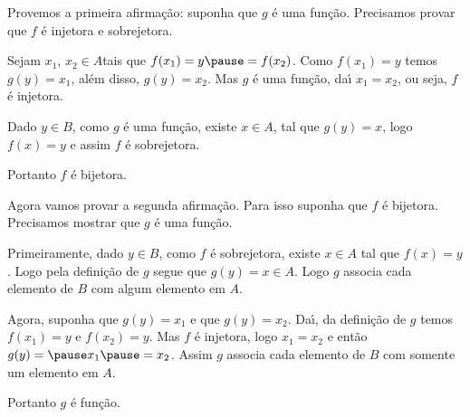 \documentclass{beamer}
\begin{document}
    \begin{frame}
        Provemos a primeira afirma\c{c}\~ao: \pause suponha que $g$ \'e uma fun\c{c}\~ao. \pause Precisamos provar que $f$ {\'e} injetora \pause e sobrejetora.\pause

        \vspace{.5cm}

        Sejam $x_1$, \pause $x_2 \in A$\pause  tais que $f(x_1) = y \pause = f(x_2)$. \pause Como $f(x_1) = y$ \pause temos $g(y) = x_1$, \pause al{\'e}m disso, \pause $g(y) = x_2$. \pause Mas $g$ {\'e} uma fun{\c c}{\~a}o, \pause da{\'\i} $x_1 = x_2$, \pause ou seja, \pause $f$ {\'e} injetora.\pause
        
        \vspace{.5cm}

        Dado $y \in B$, \pause como $g$ {\'e} uma fun{\c c}{\~a}o, \pause existe $x \in A$, \pause tal que $g(y) = x$, \pause logo $f(x) = y$ \pause e assim $f$ {\'e} sobrejetora.\pause

        \vspace{.5cm}

        Portanto $f$ {\'e} bijetora.\pause
    \end{frame}

    \begin{frame}

        Agora vamos provar a segunda afirma\c{c}\~ao. \pause Para isso suponha que $f$ \'e bijetora. \pause Precisamos mostrar que $g$ \'e uma fun\c{c}\~ao. \pause

        \vspace{.5cm}

        Primeiramente, \pause dado $y \in B$, \pause como $f$ {\'e} sobrejetora, \pause existe $x \in A$ \pause tal que $f(x) = y$. \pause Logo pela definição de $g$ \pause segue que $g(y) = x \in A$. \pause Logo $g$ associa cada elemento de $B$ \pause com algum elemento em $A$.\pause

        \vspace{.5cm}

        Agora, suponha que $g(y) = x_1$ \pause e que $g(y) = x_2$. \pause Da{\'\i}, da definição de $g$ \pause  temos $f(x_1) = y$ \pause e $f(x_2) = y$. \pause Mas $f$ {\'e} injetora, \pause logo $x_1 = x_2$ \pause e ent{\~a}o $g(y) = \pause x_1 \pause = x_2$. \pause Assim $g$ associa cada elemento de $B$ \pause com somente um elemento em $A$.\pause

        \vspace{.5cm}

        Portanto $g$ {\'e} fun{\c c}{\~a}o.\pause
    \end{frame}
\end{document}
